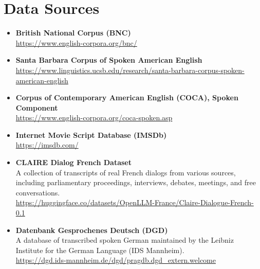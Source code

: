 ﻿\documentclass{article}
\begin{document}
\section{Data Sources}\label{app:sources}
\begin{itemize}
    \item \textbf{British National Corpus (BNC)}\\
    \url{https://www.english-corpora.org/bnc/}
    \item \textbf{Santa Barbara Corpus of Spoken American English}\\
    \url{https://www.linguistics.ucsb.edu/research/santa-barbara-corpus-spoken-american-english}
    \item \textbf{Corpus of Contemporary American English (COCA), Spoken Component}\\
    \url{https://www.english-corpora.org/coca-spoken.asp}
    \item \textbf{Internet Movie Script Database (IMSDb)}\\
    \url{https://imsdb.com/}
    \item \textbf{CLAIRE Dialog French Dataset}\\
    A collection of transcripts of real French dialogs from various sources, including parliamentary proceedings, interviews, debates, meetings, and free conversations.\\
    \url{https://huggingface.co/datasets/OpenLLM-France/Claire-Dialogue-French-0.1}
    \item \textbf{Datenbank Gesprochenes Deutsch (DGD)}\\
    A database of transcribed spoken German maintained by the Leibniz Institute for the German Language (IDS Mannheim).\\
    \url{https://dgd.ids-mannheim.de/dgd/pragdb.dgd_extern.welcome}
\end{itemize}

\clearpage



\cleardoublepage

\end{document}
